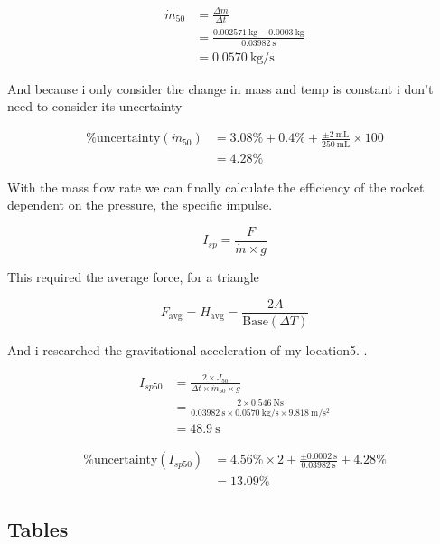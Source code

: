 \documentclass[12pt,a4paper]{article}
\begin{document}
\begin{align}
\dot{m}_{50} &= \frac{\Delta m}{\Delta t} \\
&= \frac{\SI{0.002571}{\kilo\gram} - \SI{0.0003}{\kilo\gram}}{\SI{0.03982}{\second}} \\
&= \SI{0.0570}{\kilo\gram\per\second}
\end{align}

And because i only consider the change in mass and temp is constant i don't need to consider its uncertainty

\begin{align}
\%\text{uncertainty}(\dot{m}_{50}) &= 3.08\% + 0.4\% + \frac{\pm \SI{2}{\milli\liter}}{\SI{250}{\milli\liter}} \times 100 \\
&= 4.28\%
\end{align}

With the mass flow rate we can finally calculate the efficiency of the rocket dependent on the pressure, the specific impulse.

\begin{equation}
I_{sp} = \frac{F}{\dot{m} \times g}
\end{equation}

This required the average force, for a triangle

\begin{equation}
F_{\text{avg}} = H_{\text{avg}} = \frac{2A}{\text{Base}(\Delta T)}
\end{equation}

And i researched the gravitational acceleration of my location\cite{ref1}5. .

\begin{align}
I_{sp50} &= \frac{2 \times J_{50}}{\Delta t \times \dot{m}_{50} \times g} \\
&= \frac{2 \times \SI{0.546}{\newton\second}}{\SI{0.03982}{\second} \times \SI{0.0570}{\kilo\gram\per\second} \times \SI{9.818}{\meter\per\second\squared}} \\
&= \SI{48.9}{\second}
\end{align}

\begin{align}
\%\text{uncertainty}(I_{sp50}) &= 4.56\% \times 2 + \frac{\pm \SI{0.0002}{\second}}{\SI{0.03982}{\second}} + 4.28\% \\
&= 13.09\%
\end{align}

\subsection{Tables}
\end{document}
